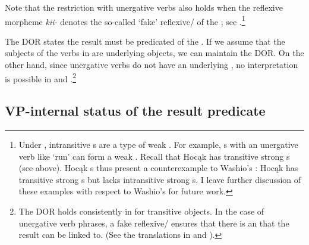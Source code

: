 \documentclass[output=paper]{LSP/langsci}
\begin{document}
Note that the restriction with unergative verbs also holds when the reflexive morpheme \textit{kii-} denotes the so-called `fake' reflexive/ of the ; see .\footnote{Under  , intransitive s are a type of weak . For example, s with an unergative verb like `run' can form a weak . Recall that Hocąk has transitive strong s (see  above). Hocąk s thus present a counterexample to Washio's : Hocąk has transitive strong s but lacks intransitive strong s. I leave further discussion of these examples with respect to Washio's  for future work.}

\begin{exe}


\end{exe}

The DOR states the result must be predicated of the . If we assume that the subjects of the verbs in  are underlying objects, we can maintain the DOR. On the other hand, since unergative verbs do not have an underlying , no  interpretation is possible in  and .\footnote{The DOR holds consistently in  for transitive objects. In the case of unergative verb phrases, a fake reflexive/ ensures that there is an  that the result can be linked to. (See the translations in  and ).}

\subsection{VP-internal status of the result predicate}\label{sec:rosen:3.2}
\end{document}
